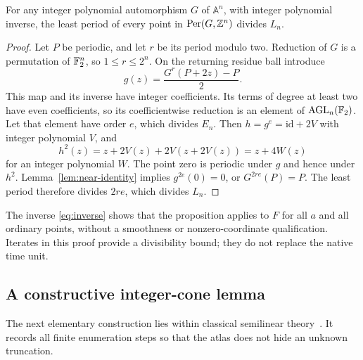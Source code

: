 \begin{proposition}
\label{prop:period-divisor}
For any integer polynomial automorphism $G$ of $\mathbb A^n$, with
integer polynomial inverse, the least period of every point in
$\operatorname{Per}(G,\mathbb Z^n)$ divides $L_n$.
\end{proposition}
\begin{proof}
Let $P$ be periodic, and let $r$ be its period modulo two.
Reduction of $G$ is a permutation of $\mathbb F_2^n$, so $1\le r\le2^n$.
On the returning residue ball introduce
\[
 g(z)=\frac{G^r(P+2z)-P}{2}.
\]
This map and its inverse have integer coefficients. Its terms of
degree at least two have even coefficients, so its coefficientwise
reduction is an element of $\operatorname{AGL}_n(\mathbb F_2)$. Let that element have
order $e$, which divides $E_n$. Then $h=g^e=\mathrm{id}+2V$
with integer polynomial $V$, and
\[
 h^2(z)=z+2V(z)+2V(z+2V(z))=z+4W(z)
\]
for an integer polynomial $W$. The point zero is periodic under
$g$ and hence under $h^2$. Lemma~\ref{lem:near-identity} implies
$g^{2e}(0)=0$, or $G^{2re}(P)=P$. The least period therefore
divides $2re$, which divides $L_n$.
\end{proof}

The inverse \eqref{eq:inverse} shows that the proposition applies
to $F$ for all $a$ and all ordinary points, without a smoothness or
nonzero-coordinate qualification. Iterates in this proof provide a
divisibility bound; they do not replace the native time unit.

\subsection{A constructive integer-cone lemma}
\label{sec:cone}

The next elementary construction lies within classical semilinear
theory~\cite{ginsburgSpanier1966}. It records all finite enumeration
steps so that the atlas does not hide an unknown truncation.

